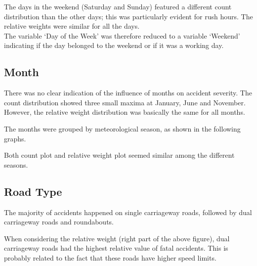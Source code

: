 \documentclass[11pt]{article}
\begin{document}
    \begin{center}
    \end{center}

The days in the weekend (Saturday and Sunday) featured a different count distribution than the other days; this was particularly evident for rush hours. The relative weights were similar for all the days.\\
The variable `Day of the Week' was therefore reduced to a variable `Weekend' indicating if the day belonged to the weekend or if it was a working day.
    
    \hypertarget{month}{%
\subsection{Month}\label{month}}
    
There was no clear indication of the influence of months on accident severity. The count distribution showed three small maxima at January, June and November.\\
However, the relative weight distribution was basically the same for all months.

The months were grouped by meteorological season, as shown in the following graphs.

    \begin{center}
    \end{center}

Both count plot and relative weight plot seemed similar among the different seasons.

    \hypertarget{road-type}{%
\subsection{Road Type}\label{road-type}}

    \begin{center}
    \end{center}

The majority of accidents happened on single carriageway roads, followed by dual carriageway roads and roundabouts.

When considering the relative weight (right part of the above figure), dual carriageway roads had the highest relative value of fatal accidents. This is probably related to the fact that these roads have higher speed limits.
\end{document}
